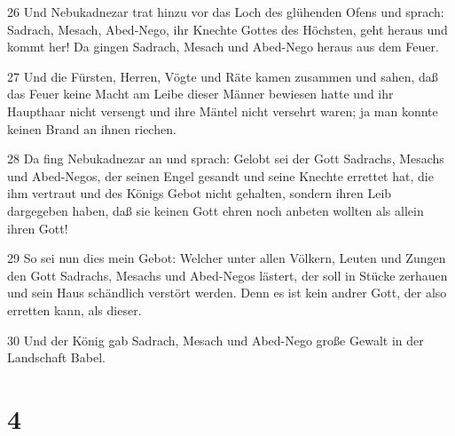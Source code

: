 \par 26 Und Nebukadnezar trat hinzu vor das Loch des glühenden Ofens und sprach: Sadrach, Mesach, Abed-Nego, ihr Knechte Gottes des Höchsten, geht heraus und kommt her! Da gingen Sadrach, Mesach und Abed-Nego heraus aus dem Feuer.
\par 27 Und die Fürsten, Herren, Vögte und Räte kamen zusammen und sahen, daß das Feuer keine Macht am Leibe dieser Männer bewiesen hatte und ihr Haupthaar nicht versengt und ihre Mäntel nicht versehrt waren; ja man konnte keinen Brand an ihnen riechen.
\par 28 Da fing Nebukadnezar an und sprach: Gelobt sei der Gott Sadrachs, Mesachs und Abed-Negos, der seinen Engel gesandt und seine Knechte errettet hat, die ihm vertraut und des Königs Gebot nicht gehalten, sondern ihren Leib dargegeben haben, daß sie keinen Gott ehren noch anbeten wollten als allein ihren Gott!
\par 29 So sei nun dies mein Gebot: Welcher unter allen Völkern, Leuten und Zungen den Gott Sadrachs, Mesachs und Abed-Negos lästert, der soll in Stücke zerhauen und sein Haus schändlich verstört werden. Denn es ist kein andrer Gott, der also erretten kann, als dieser.
\par 30 Und der König gab Sadrach, Mesach und Abed-Nego große Gewalt in der Landschaft Babel.

\chapter{4}

